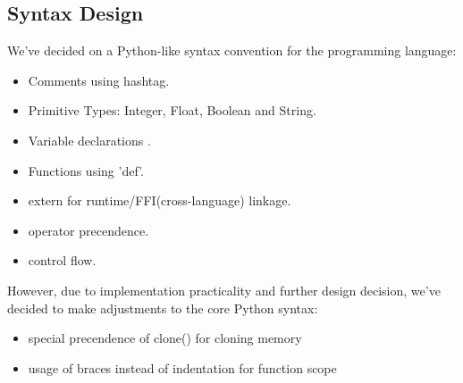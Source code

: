 \documentclass[a4paper]{article}
\begin{document}
	\subsection{Syntax Design}
	
	We've decided on a Python-like syntax convention for the programming language:
	\begin{itemize}
		\item Comments using hashtag.
		\item Primitive Types: Integer, Float, Boolean and String.
		\item Variable declarations .
		\item Functions using 'def'.
		\item extern for runtime/FFI(cross-language) linkage.
		\item operator precendence.
		\item control flow.
	\end{itemize}
	However, due to implementation practicality and further design decision, we've decided to make adjustments to the core Python syntax:
	\begin{itemize}
		\item special precendence of clone() for cloning memory
		\item usage of braces instead of indentation for function scope
	\end{itemize}
	
\end{document}
